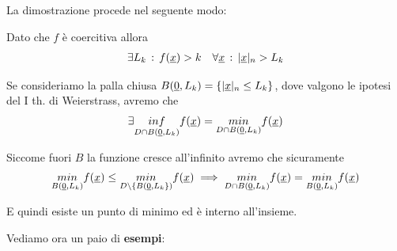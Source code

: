 \bigskip

La dimostrazione procede nel seguente modo:

Dato che $f$ è coercitiva allora 
\begin{align}
	\exists L_k \, : \, f(\underline{x})>k \quad \forall \underline{x} \, : \,|\underline{x}|_n>L_k
\end{align}

Se consideriamo la palla chiusa $B(\underline{0},L_k)=\{|\underline{x}|_n\leq L_k\}$, dove valgono le ipotesi del I th. di Weierstrass, avremo che 
\begin{align}
	\exists \underset{\scriptsize{D \cap B(\underline{0},L_k)}}{inf} f(\underline{x})= \underset{\scriptsize{D \cap B(\underline{0},L_k)}}{min}f(\underline{x})
\end{align}


Siccome fuori $B$ la funzione cresce all'infinito
avremo che sicuramente 
\begin{align}
	\underset{\scriptsize{ B(\underline{0},L_k)}}{min} f(\underline{x}) \leq \underset{\scriptsize{D \backslash \{  B(\underline{0},L_k \} )}}{min} f(\underline{x}) \implies \underset{\scriptsize{D \cap B(\underline{0},L_k)}}{min}f(\underline{x}) = \underset{\scriptsize{ B(\underline{0},L_k)}}{min} f(\underline{x})
\end{align}

E quindi esiste un punto di minimo ed è interno all'insieme.

Vediamo ora un paio di \textbf{esempi}:

